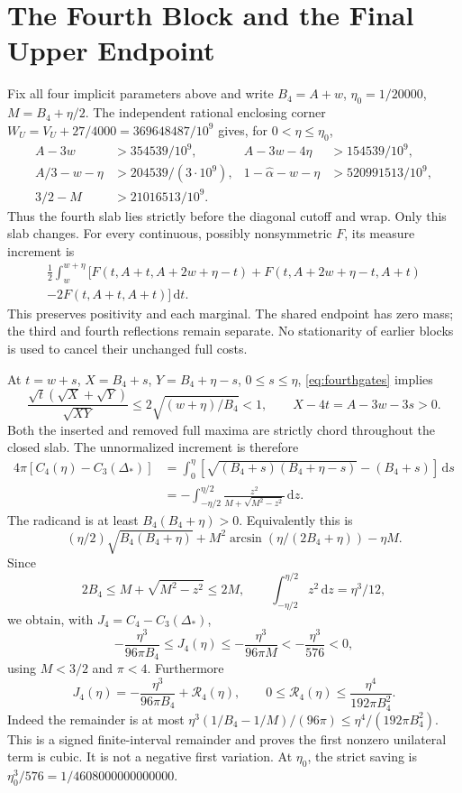\documentclass[11pt,letterpaper]{article}
\newcommand{\dd}{\,\mathrm d}
\newcommand{\al}{\widehat\alpha}
\newcommand{\Ds}{\Delta_*}
\begin{document}
\section{The Fourth Block and the Final Upper Endpoint}\label{sec:fourth}
Fix all four implicit parameters above and write $B_4=A+w$,
$\eta_0=1/20000$, $M=B_4+\eta/2$.
The independent rational enclosing corner
$W_U=V_U+27/4000=369648487/10^9$ gives, for $0<\eta\le\eta_0$,
\begin{align}
 A-3w&>354539/10^9, & A-3w-4\eta&>154539/10^9,\nonumber\\
 A/3-w-\eta&>204539/(3\cdot10^9),
 &1-\al-w-\eta&>520991513/10^9,\label{eq:fourthgates}\\
 3/2-M&>21016513/10^9.&&\nonumber
\end{align}
Thus the fourth slab lies strictly before the diagonal cutoff and wrap.
Only this slab changes. For every continuous, possibly nonsymmetric $F$,
its measure increment is
\begin{multline*}
 \frac12\int_w^{w+\eta}
 [F(t,A+t,A+2w+\eta-t)+F(t,A+2w+\eta-t,A+t)\\
 -2F(t,A+t,A+t)]\dd t.
\end{multline*}
This preserves positivity and each marginal. The shared endpoint has zero
mass; the third and fourth reflections remain separate. No stationarity
of earlier blocks is used to cancel their unchanged full costs.

At $t=w+s$, $X=B_4+s$, $Y=B_4+\eta-s$, $0\le s\le\eta$,
\eqref{eq:fourthgates} implies
\[
 \frac{\sqrt t(\sqrt X+\sqrt Y)}{\sqrt{XY}}
 \le2\sqrt{(w+\eta)/B_4}<1,
 \qquad X-4t=A-3w-3s>0.
\]
Both the inserted and removed full maxima are strictly chord throughout
the closed slab. The unnormalized increment is therefore
\begin{align}
 4\pi[C_4(\eta)-C_3(\Ds)]
 &=\int_0^\eta[\sqrt{(B_4+s)(B_4+\eta-s)}-(B_4+s)]\dd s\nonumber\\
 &=-\int_{-\eta/2}^{\eta/2}
       \frac{z^2}{M+\sqrt{M^2-z^2}}\dd z.\label{eq:decrement}
\end{align}
The radicand is at least $B_4(B_4+\eta)>0$. Equivalently this is
\[ (\eta/2)\sqrt{B_4(B_4+\eta)}+M^2\arcsin(\eta/(2B_4+\eta))-\eta M. \]
Since
\[
 2B_4\le M+\sqrt{M^2-z^2}\le2M,\qquad
 \int_{-\eta/2}^{\eta/2}z^2\dd z=\eta^3/12,
\]
we obtain, with $J_4=C_4-C_3(\Ds)$,
\[
 -\frac{\eta^3}{96\pi B_4}\le J_4(\eta)
 \le-\frac{\eta^3}{96\pi M}< -\frac{\eta^3}{576}<0,
\]
using $M<3/2$ and $\pi<4$. Furthermore
\[
 J_4(\eta)=-\frac{\eta^3}{96\pi B_4}+\mathcal R_4(\eta),
 \qquad0\le\mathcal R_4(\eta)\le\frac{\eta^4}{192\pi B_4^2}.
\]
Indeed the remainder is at most $\eta^3(1/B_4-1/M)/(96\pi)\le\eta^4/(192\pi B_4^2)$. This is a signed finite-interval remainder and proves the first nonzero
unilateral term is cubic. It is not a negative first variation.
At $\eta_0$, the strict saving is
$\eta_0^3/576=1/4608000000000000$.
\end{document}
